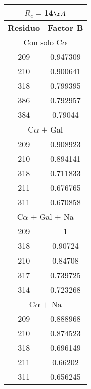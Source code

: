 \begin{tabular}[c]{|c|c|}
\multicolumn{2}{c}{$R_c=$14$\AA$}\\\hline
\textbf{Residuo}&\textbf{Factor B}\\\hline
\multicolumn{2}{c}{Con solo C$\alpha$}\\\hline
       209&  0.947309\\
       210&  0.900641\\
       318&  0.799395\\
       386&  0.792957\\
       384&   0.79044\\
\hline
\multicolumn{2}{c}{C$\alpha$ $+$ Gal}\\\hline
       209&  0.908923\\
       210&  0.894141\\
       318&  0.711833\\
       211&  0.676765\\
       311&  0.670858\\
\hline
\multicolumn{2}{c}{C$\alpha$ $+$ Gal $+$ Na}\\\hline
       209&         1\\
       318&   0.90724\\
       210&   0.84708\\
       317&  0.739725\\
       314&  0.723268\\
\hline
\multicolumn{2}{c}{C$\alpha$ $+$ Na}\\\hline
       209&  0.888968\\
       210&  0.874523\\
       318&  0.696149\\
       211&   0.66202\\
       311&  0.656245\\
\hline
\end{tabular}

